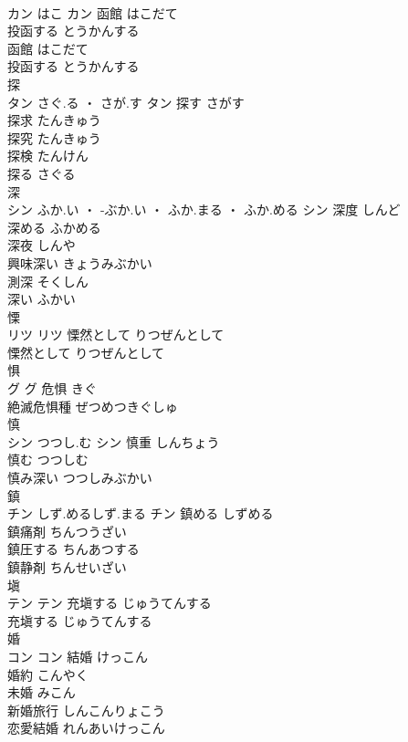 \documentclass[8pt]{extreport}
\begin{document}
\begin{CJK}{UTF8}{min}
\\	カン	はこ	カン	函館	はこだて	
\\	投函する	とうかんする	
\\	函館	はこだて	
\\	投函する	とうかんする	
\\	探	
\\	タン	さぐ.る ・ さが.す	タン	探す	さがす	
\\	探求	たんきゅう	
\\	探究	たんきゅう	
\\	探検	たんけん	
\\	探る	さぐる	
\\	深	
\\	シン	ふか.い ・ -ぶか.い ・ ふか.まる ・ ふか.める	シン	深度	しんど	
\\	深める	ふかめる	
\\	深夜	しんや	
\\	興味深い	きょうみぶかい	
\\	測深	そくしん	
\\	深い	ふかい	
\\	慄	
\\	リツ		リツ	慄然として	りつぜんとして	
\\	慄然として	りつぜんとして	
\\	惧	
\\	グ		グ	危惧	きぐ	
\\	絶滅危惧種	ぜつめつきぐしゅ	
\\	慎	
\\	シン	つつし.む	シン	慎重	しんちょう	
\\	慎む	つつしむ	
\\	慎み深い	つつしみぶかい	
\\	鎮	
\\	チン	しず.めるしず.まる	チン	鎮める	しずめる	
\\	鎮痛剤	ちんつうざい	
\\	鎮圧する	ちんあつする	
\\	鎮静剤	ちんせいざい	
\\	塡	
\\	テン		テン	充塡する	じゅうてんする	
\\	充塡する	じゅうてんする	
\\	婚	
\\	コン		コン	結婚	けっこん	
\\	婚約	こんやく	
\\	未婚	みこん	
\\	新婚旅行	しんこんりょこう	
\\	恋愛結婚	れんあいけっこん	

\end{CJK}
\end{document}
